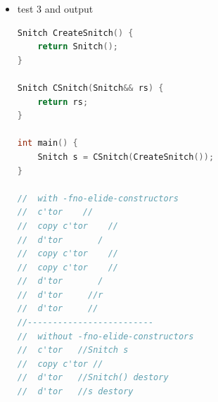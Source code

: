 \documentclass[a4paper,11pt,twoside]{book}
\begin{document}
\begin{itemize}
	\item test 3 and output
\begin{lstlisting}[frame=single, language=c++]
Snitch CreateSnitch() {
	return Snitch();
}
	
Snitch CSnitch(Snitch&& rs) {
	return rs;
}
	
int main() {
	Snitch s = CSnitch(CreateSnitch());
}
	
//	with -fno-elide-constructors
//	c'tor    //
//	copy c'tor    //
//	d'tor       /
//	copy c'tor    //
//	copy c'tor    //
//	d'tor       /
//	d'tor     //r
//	d'tor     //
//-------------------------
//	without -fno-elide-constructors
//	c'tor   //Snitch s
//	copy c'tor //
//	d'tor   //Snitch() destory
//	d'tor   //s destory
\end{lstlisting}
\end{itemize}
\end{document}
